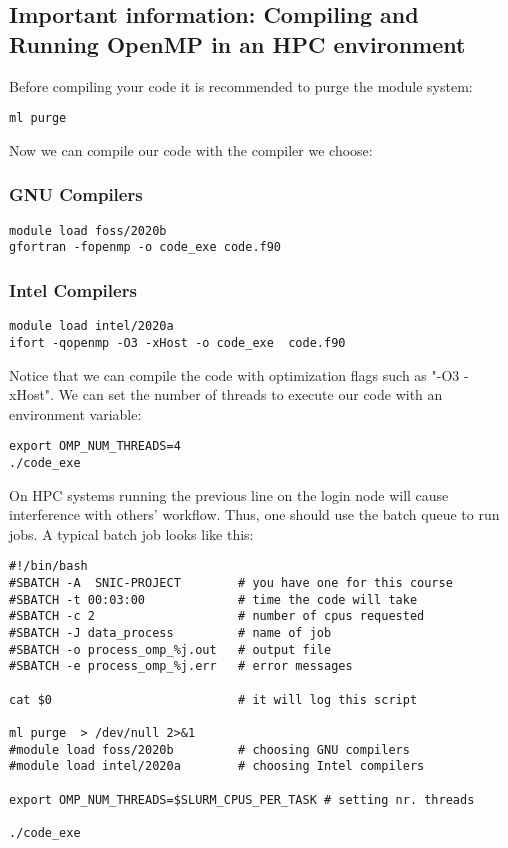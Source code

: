 \subsection{Important information: Compiling and Running OpenMP in an HPC environment }

Before compiling your code it is recommended to purge the module system:

\begin{verbatim}
ml purge
\end{verbatim}

Now we can compile our code with the compiler we choose:

\subsubsection{GNU Compilers}

\begin{verbatim}
module load foss/2020b
gfortran -fopenmp -o code_exe code.f90
\end{verbatim}

\subsubsection{Intel Compilers}

\begin{verbatim}
module load intel/2020a
ifort -qopenmp -O3 -xHost -o code_exe  code.f90
\end{verbatim}

Notice that we can compile the code with optimization flags such as "-O3 -xHost". 
We can set the number of threads to  execute our code with an environment variable:

\begin{verbatim}
export OMP_NUM_THREADS=4
./code_exe
\end{verbatim}

On HPC systems running the previous line on the login node will cause interference
with others' workflow. Thus, one should use the batch queue to run jobs. A typical
batch job looks like this:


\begin{verbatim}
#!/bin/bash
#SBATCH -A  SNIC-PROJECT        # you have one for this course
#SBATCH -t 00:03:00             # time the code will take
#SBATCH -c 2                    # number of cpus requested
#SBATCH -J data_process         # name of job
#SBATCH -o process_omp_%j.out   # output file
#SBATCH -e process_omp_%j.err   # error messages

cat $0                          # it will log this script

ml purge  > /dev/null 2>&1 
#module load foss/2020b         # choosing GNU compilers
#module load intel/2020a        # choosing Intel compilers

export OMP_NUM_THREADS=$SLURM_CPUS_PER_TASK # setting nr. threads

./code_exe
\end{verbatim}

